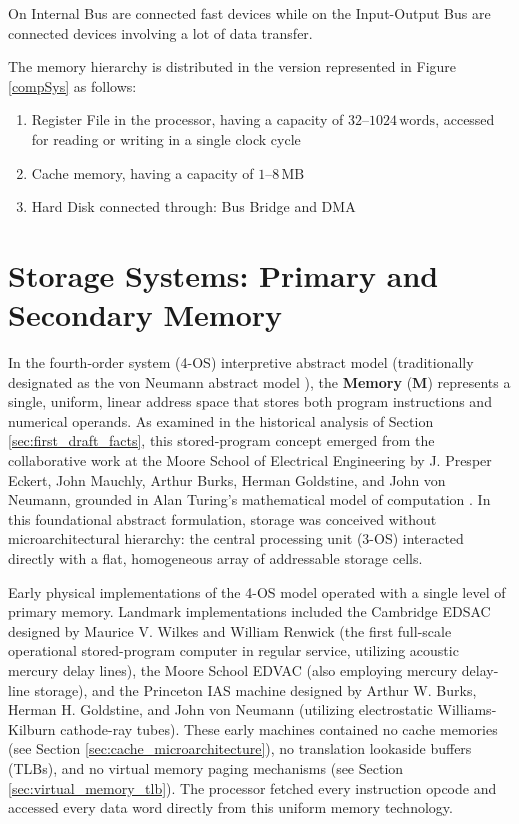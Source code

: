 On Internal Bus are connected fast devices while on the Input-Output Bus are connected devices involving a lot of data transfer.

The memory hierarchy is distributed in the version represented in Figure \ref{compSys}  as follows:
\begin{enumerate}
    \item Register File in the processor, having a capacity of $32\text{--}1024\,\text{words}$, accessed for reading or writing in a single clock cycle
    \item Cache memory, having a capacity of $1\text{--}8\,\text{MB}$
    \item Hard Disk connected through: Bus Bridge and DMA
\end{enumerate}


\section{Storage Systems: Primary and Secondary Memory}\label{sec:storage_systems}

In the fourth-order system (4-OS) interpretive abstract model (traditionally designated as the von Neumann abstract model \cite{vonNeumann1945}), the \textbf{Memory} ($\mathbf{M}$) represents a single, uniform, linear address space that stores both program instructions and numerical operands. As examined in the historical analysis of Section \ref{sec:first_draft_facts}, this stored-program concept emerged from the collaborative work at the Moore School of Electrical Engineering by J. Presper Eckert, John Mauchly, Arthur Burks, Herman Goldstine, and John von Neumann, grounded in Alan Turing's mathematical model of computation \cite{Turing36}. In this foundational abstract formulation, storage was conceived without microarchitectural hierarchy: the central processing unit (3-OS) interacted directly with a flat, homogeneous array of addressable storage cells. 

Early physical implementations of the 4-OS model operated with a single level of primary memory. Landmark implementations included the Cambridge EDSAC designed by Maurice V. Wilkes and William Renwick \cite{wilkes1949edsac} (the first full-scale operational stored-program computer in regular service, utilizing acoustic mercury delay lines), the Moore School EDVAC \cite{vonNeumann1945, gluck1953edvac} (also employing mercury delay-line storage), and the Princeton IAS machine designed by Arthur W. Burks, Herman H. Goldstine, and John von Neumann \cite{burks1946preliminary} (utilizing electrostatic Williams-Kilburn cathode-ray tubes). These early machines contained no cache memories (see Section \ref{sec:cache_microarchitecture}), no translation lookaside buffers (TLBs), and no virtual memory paging mechanisms (see Section \ref{sec:virtual_memory_tlb}). The processor fetched every instruction opcode and accessed every data word directly from this uniform memory technology.

